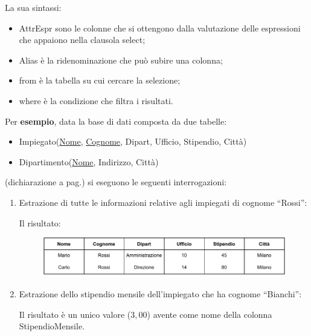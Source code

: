 \documentclass[a4paper]{article}
\newcommand{\dquotes}[1]{``#1''}
\begin{document}
	\noindent
	La sua sintassi:
	
	\begin{itemize}
		\item \textsf{AttrEspr} sono le colonne che si ottengono dalla valutazione delle espressioni che appaiono nella clausola \textsf{select};
		\item \textsf{Alias} è la ridenominazione che può subire una colonna;
		\item \textsf{from} è la tabella su cui cercare la selezione;
		\item \textsf{where} è la condizione che filtra i risultati.
	\end{itemize}
	Per \textcolor{Green4}{\textbf{esempio}}, data la base di dati composta da due tabelle:
	\begin{itemize}
		\item \textsf{Impiegato(\underline{Nome}, \underline{Cognome}, Dipart, Ufficio, Stipendio, Città)}
		\item \textsf{Dipartimento(\underline{Nome}, Indirizzo, Città)}
	\end{itemize}
	(dichiarazione a pag.\pageref{img: select dbms}) si eseguono le seguenti interrogazioni:
	\begin{enumerate}
		\item Estrazione di tutte le informazioni relative agli impiegati di cognome \dquotes{Rossi}:
		
		Il risultato:
		\begin{figure}[!htp]
			\centering
			\includegraphics[width=\textwidth]{img/select-ex1.pdf}
		\end{figure}
		
		\item Estrazione dello stipendio mensile dell'impiegato che ha cognome \dquotes{Bianchi}:
		
		Il risultato è un unico valore ($3,00$) avente come nome della colonna \textsf{StipendioMensile}.
	\end{enumerate}\newpage
\end{document}
